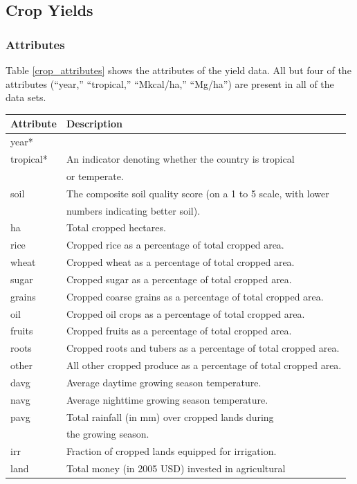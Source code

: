 \documentclass[11pt]{article}
\begin{document}
\clearpage
\subsection{Crop Yields}
\subsubsection{Attributes}
Table \ref{crop_attributes} shows the attributes of the yield data. All but four of the attributes (``year,'' ``tropical,'' ``Mkcal/ha,'' ``Mg/ha'') are present in all of the data sets.
\begin{table}[h!]
\centering
\begin{tabular}{ll}
\toprule
\textbf{Attribute} & \textbf{Description} \\
\midrule
year* & \\
tropical* & An indicator denoting whether the country is tropical \\
& or temperate. \\
soil & The composite soil quality score (on a 1 to 5 scale, with lower \\
& numbers indicating better soil). \\
ha & Total cropped hectares. \\
rice & Cropped rice as a percentage of total cropped area. \\
wheat & Cropped wheat as a percentage of total cropped area.\\
sugar & Cropped sugar as a percentage of total cropped area.\\
grains & Cropped coarse grains as a percentage of total cropped area.\\
oil & Cropped oil crops as a percentage of total cropped area.\\
fruits & Cropped fruits as a percentage of total cropped area.\\
roots & Cropped roots and tubers as a percentage of total cropped area.\\
other & All other cropped produce as a percentage of total cropped area. \\
davg & Average daytime growing season temperature. \\
navg & Average nighttime growing season temperature. \\
pavg & Total rainfall (in mm) over cropped lands during \\
& the growing season. \\
irr & Fraction of cropped lands equipped for irrigation. \\
land & Total money (in 2005 USD) invested in agricultural \\

\end{tabular}
\end{table}
\end{document}

